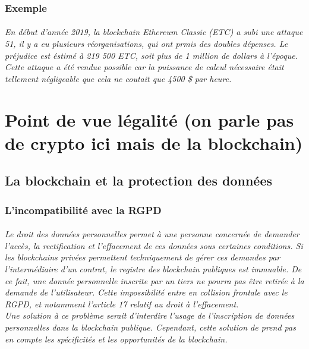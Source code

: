\documentclass[12pt, a4paper, oneside]{book}
\begin{document}
    \section{Exemple}
    \paragraph{En début d'année 2019, la blockchain Ethereum Classic (ETC) a subi une attaque 51, il y a eu plusieurs réorganisations, qui ont prmis des doubles dépenses. Le préjudice est éstimé à 219 500 ETC, soit plus de 1 million de dollars à l'époque.
    \\
    Cette attaque a été rendue possible car la puissance de calcul nécessaire était tellement négligeable que cela ne coutait que 4500 \$ par heure.\cite{51ETC}}
    \part{Point de vue légalité (on parle pas de crypto ici mais de la blockchain)}
    \chapter{La blockchain et la protection des données}
    \section{L'incompatibilité avec la RGPD}
    \paragraph{Le droit des données personnelles permet 
    à une personne concernée de demander l’accès, la rectification 
    et l’effacement de ces données sous certaines conditions. 
    Si les blockchains privées permettent techniquement de gérer
    ces demandes par l’intermédiaire d’un contrat,
    le registre des blockchain publiques est immuable. De ce fait,
    une donnée personnelle inscrite par un tiers ne pourra pas être retirée 
    à la demande de l’utilisateur. Cette impossibilité entre en collision frontale avec le RGPD, 
    et notamment l’article 17 relatif au droit à l’effacement. 
    \\ 
    \newline
    Une solution à ce problème serait d'interdire l'usage de l'inscription de données personnelles dans la blockchain publique. 
    Cependant, cette solution de prend pas en compte les spécificités et les opportunités de la blockchain.
    \cite{reg}}
\end{document}
